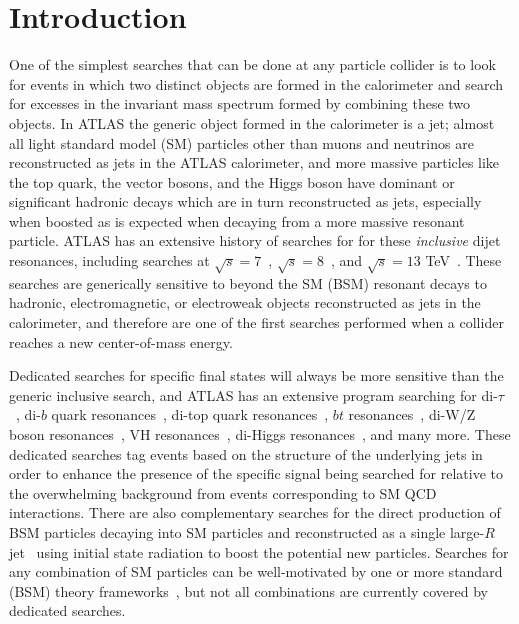 \section{Introduction}
\label{sec:CWoLa:intro}
One of the simplest searches that can be done at any particle collider is to look for events in which two distinct objects are formed in the calorimeter and search for excesses in the invariant mass spectrum formed by combining these two objects.
In ATLAS the generic object formed in the calorimeter is a jet; almost all light standard model (SM) particles other than muons and neutrinos are reconstructed as jets in the ATLAS calorimeter, and more massive particles like the top quark, the vector bosons, and the Higgs boson have dominant or significant hadronic decays which are in turn reconstructed as jets, especially when boosted as is expected when decaying from a more massive resonant particle.
ATLAS has an extensive history of searches for for these \textit{inclusive} dijet resonances, including searches at $\sqrt{s}=7$~\cite{Aad:2010ae,Aad:2011aj,Aad:2011fq}, $\sqrt{s}=8$~\cite{Aad:2014aqa}, and $\sqrt{s}=13$ TeV~\cite{ATLAS:2015nsi,Aaboud:2017yvp,Aaboud:2018fzt,Aad:2019hjw}.
These searches are generically sensitive to beyond the SM (BSM) resonant decays to hadronic, electromagnetic, or electroweak objects reconstructed as jets in the calorimeter, and therefore are one of the first searches performed when a collider reaches a new center-of-mass energy.

Dedicated searches for specific final states will always be more sensitive than the generic inclusive search, and ATLAS has an extensive program searching for di-$\tau$~\cite{Aaboud:2016cre,Aaboud:2017sjh}, di-$b$ quark resonances~\cite{Aaboud:2016nbq,Aaboud:2018tqo}, di-top quark resonances~\cite{Aaboud:2018mjh}, $bt$ resonances~\cite{Aaboud:2018juj}, di-W/Z boson resonances~\cite{Aaboud:2016okv,Aaboud:2017fgj,Aaboud:2017itg,Aaboud:2017eta,Aad:2019fbh}, VH resonances~\cite{Aaboud:2018eoy,Aaboud:2017cxo,Aaboud:2017ahz}, di-Higgs resonances~\cite{Aaboud:2018knk}, and many more.
These dedicated searches tag events based on the structure of the underlying jets in order to enhance the presence of the specific signal being searched for relative to the overwhelming background from events corresponding to SM QCD interactions.
There are also complementary searches for the direct production of BSM particles decaying into SM particles and reconstructed as a single large-$R$ jet~\cite{Aaboud:2018zba,Aaboud:2018fzt,Aaboud:2019zxd} using initial state radiation to boost the potential new particles.
Searches for any combination of SM particles can be well-motivated by one or more standard (BSM) theory frameworks~\cite{Craig:2016rqv,Kim:2019rhy,}, but not all combinations are currently covered by dedicated searches.

